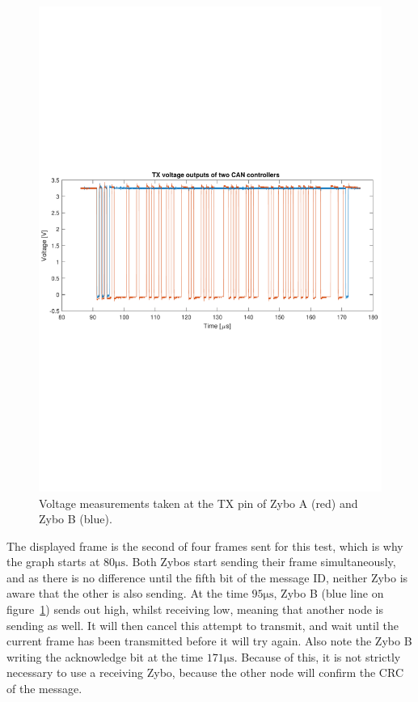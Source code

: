 \begin{figure}[h]
	\centering
	\includegraphics[width = \linewidth]{graphics/CAN_test3_2TX}
	\caption{Voltage measurements taken at the TX pin of Zybo A (red) and Zybo B (blue).}
	\label{fig:CAN_test3_2TX}
\end{figure}

The displayed frame is the second of four frames sent for this test, which is why the graph starts at $80 \si{\micro\second}$.
Both Zybos start sending their frame simultaneously, and as there is no difference until the fifth bit of the message ID, neither Zybo is aware that the other is also sending.
At the time $95\si{\micro\second}$, Zybo B (blue line on figure~\ref{fig:CAN_test3_2TX}) sends out high, whilst receiving low, meaning that another node is sending as well. 
It will then cancel this attempt to transmit, and wait until the current frame has been transmitted before it will try again.
Also note the Zybo B writing the acknowledge bit at the time $171 \si{\micro\second}$.
Because of this, it is not strictly necessary to use a receiving Zybo, because the other node will confirm the CRC of the message.\\

